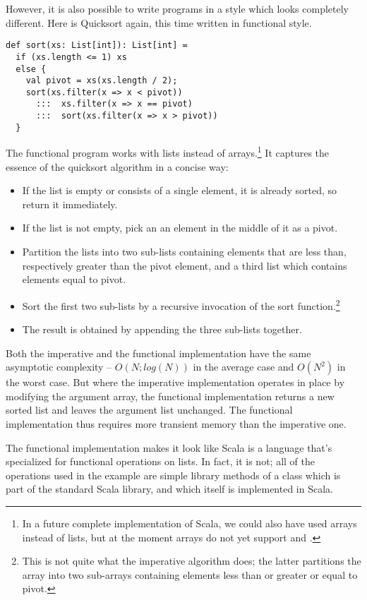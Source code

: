 However, it is also possible to write programs in a style which looks
completely different. Here is Quicksort again, this time written in
functional style.

\begin{lstlisting}
def sort(xs: List[int]): List[int] = 
  if (xs.length <= 1) xs
  else {
    val pivot = xs(xs.length / 2);
    sort(xs.filter(x => x < pivot))
      :::  xs.filter(x => x == pivot)
      :::  sort(xs.filter(x => x > pivot))
  }
\end{lstlisting}

The functional program works with lists instead of arrays.\footnote{In
a future complete implementation of Scala, we could also have used arrays
instead of lists, but at the moment arrays do not yet support
 and \code{:::}.}
It captures the essence of the quicksort algorithm in a concise way:
\begin{itemize}
\item If the list is empty or consists of a single element, 
      it is already sorted, so return it immediately.
\item If the list is not empty, pick an an element in the middle of
      it as a pivot.
\item Partition the lists into two sub-lists containing elements that
are less than, respectively greater than the pivot element, and a
third list which contains elements equal to pivot.
\item Sort the first two sub-lists by a recursive invocation of
the sort function.\footnote{This is not quite what the imperative algorithm does;
the latter partitions the array into two sub-arrays containing elements
less than or greater or equal to pivot.}
\item The result is obtained by appending the three sub-lists together.
\end{itemize}
Both the imperative and the functional implementation have the same
asymptotic complexity -- $O(N;log(N))$ in the average case and
$O(N^2)$ in the worst case. But where the imperative implementation
operates in place by modifying the argument array, the functional
implementation returns a new sorted list and leaves the argument
list unchanged. The functional implementation thus requires more
transient memory than the imperative one.

The functional implementation makes it look like Scala is a language
that's specialized for functional operations on lists. In fact, it
is not; all of the operations used in the example are simple library
methods of a class  which is part of the standard
Scala library, and which itself is implemented in Scala.

